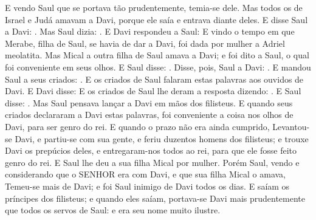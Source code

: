{  E vendo Saul que se portava tão prudentemente, temia-se dele.
  Mas todos os de Israel e Judá amavam a Davi, porque ele saía e entrava diante deles.
  E disse Saul a Davi: . Mas Saul dizia: .
  E Davi respondeu a Saul: 
  E vindo o tempo em que Merabe, filha de Saul, se havia de dar a Davi, foi dada por mulher a Adriel meolatita.
  Mas Mical a outra filha de Saul amava a Davi; e foi dito a Saul, o qual foi conveniente em seus olhos.
  E Saul disse: . Disse, pois, Saul a Davi: .
  E mandou Saul a seus criados: .
  E os criados de Saul falaram estas palavras aos ouvidos de Davi. E Davi disse: 
  E os criados de Saul lhe deram a resposta dizendo: .
  E Saul disse: . Mas Saul pensava lançar a Davi em mãos dos filisteus.
  E quando seus criados declararam a Davi estas palavras, foi conveniente a coisa nos olhos de Davi, para ser genro do rei. E quando o prazo não era ainda cumprido,
  Levantou-se Davi, e partiu-se com sua gente, e feriu duzentos homens dos filisteus; e trouxe Davi os prepúcios deles, e entregaram-nos todos ao rei, para que ele fosse feito genro do rei. E Saul lhe deu a sua filha Mical por mulher.
  Porém Saul, vendo e considerando que o SENHOR era com Davi, e que sua filha Mical o amava,
  Temeu-se mais de Davi; e foi Saul inimigo de Davi todos os dias.
  E saíam os príncipes dos filisteus; e quando eles saíam, portava-se Davi mais prudentemente que todos os servos de Saul: e era seu nome muito ilustre.
\par }

